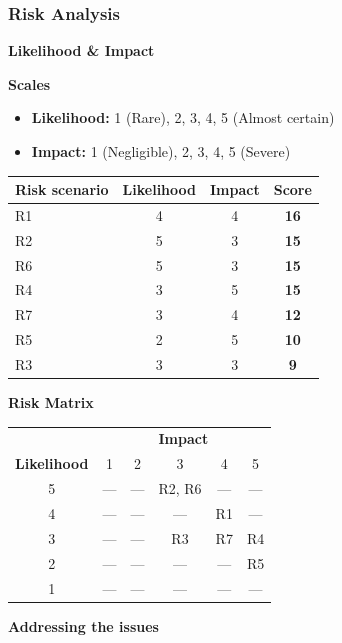 \subsubsection{Risk Analysis}

\textbf{Likelihood \& Impact}

\textbf{Scales}
\begin{itemize}[noitemsep]
    \item \textbf{Likelihood:} 1 (Rare), 2, 3, 4, 5 (Almost certain)
    \item \textbf{Impact:} 1 (Negligible), 2, 3, 4, 5 (Severe)
\end{itemize}

\begin{center}
\begin{tabular}{lccc}
\toprule
\textbf{Risk scenario} & \textbf{Likelihood} & \textbf{Impact} & \textbf{Score} \\
\midrule
R1  & 4 & 4 & \textbf{16} \\
R2  & 5 & 3 & \textbf{15} \\
R6  & 5 & 3 & \textbf{15} \\
R4  & 3 & 5 & \textbf{15} \\
R7 & 3 & 4 & \textbf{12} \\
R5  & 2 & 5 & \textbf{10} \\
R3  & 3 & 3 & \textbf{9} \\
\bottomrule
\end{tabular}
\end{center}

\textbf{Risk Matrix}

\begin{center}
\renewcommand{\arraystretch}{1.3}
\begin{tabular}{c|ccccc}
\multicolumn{1}{c}{} & \multicolumn{5}{c}{\textbf{Impact}} \\
\textbf{Likelihood} & 1 & 2 & 3 & 4 & 5 \\
\hline
5 & --- & --- & R2, R6   & ---  & ---     \\
4 & --- & --- & ---      & R1   & ---     \\
3 & --- & --- & R3       & R7  & R4      \\
2 & --- & --- & ---      & ---  & R5      \\
1 & --- & --- & ---      & ---  & ---     \\
\end{tabular}
\end{center}

\textbf{Addressing the issues}

